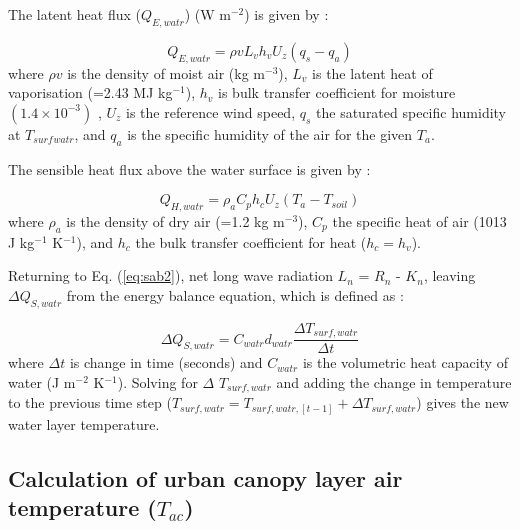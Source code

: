 \documentclass[gmd, manuscript]{copernicus}
\begin{document}
The latent heat flux (\ensuremath{Q_{E,watr}}) (W m$^{-2}$) is given by \cite{Arya2001}:

\begin{equation} 
\ensuremath{Q_{E,watr}} = \ensuremath{\rho v} \ensuremath{L_{v}} \ensuremath{h_{v}} \ensuremath{U_{z}} (\ensuremath{q_{s}} - \ensuremath{q_{a}})
\label{eq:lewtr} \end{equation} where \ensuremath{\rho v} is the density of moist air (kg m$^{-3}$), \ensuremath{L_{v}} is the latent heat of vaporisation (=2.43 MJ kg$^{-1}$), \ensuremath{h_{v}} is bulk transfer coefficient for moisture $(1.4\times10^{-3})$ \citep{Hicks1972,Jones2005}, \ensuremath{U_{z}} is the reference wind speed, \ensuremath{q_{s}} the saturated specific humidity at $T_{surf}$$_{watr}$, and \ensuremath{q_{a}} is the specific humidity of the air for the given \ensuremath{T_{a}}. 

The sensible heat flux above the water surface is given by \cite{MolinaMartinez2006}:


\begin{equation} 
Q_{H,watr} = \ensuremath{\rho_{a}} \ensuremath{C_{p}} \ensuremath{h_{c}} \ensuremath{U_{z}} (\ensuremath{T_{a}}-\ensuremath{T_{soil}})
\label{eq:hwtr} \end{equation} where \ensuremath{\rho_{a}} is the density of dry air (=1.2 kg m$^{-3}$), \ensuremath{C_{p}} the specific heat of air (1013 J kg$^{-1}$ K$^{-1}$), and \ensuremath{h_{c}} the bulk transfer coefficient for heat ($h_{c} = h_{v}$). 

Returning to Eq. (\ref{eq:sab2}), net long wave radiation \ensuremath{L_{n}} = \ensuremath{R_{n}} - \ensuremath{K_{n}}, leaving $\ensuremath{\Delta Q_{S,watr}}$ from the energy balance equation, which is defined as \citep{MolinaMartinez2006}:

\begin{equation} 
\ensuremath{\Delta Q_{S,watr}} = \ensuremath{C_{watr}} \ensuremath{d_{watr}} \frac{\Delta T_{surf,watr}}{\Delta t}
\label{eq:swrt} \end{equation} where $\Delta t$ is change in time (seconds) and \ensuremath{C_{watr}} is the volumetric heat capacity of water (J m$^{-2}$ K$^{-1}$). Solving for $\Delta$ $T_{surf,watr}$ and adding the change in temperature to the previous time step ($T_{surf,watr} = T_{surf,watr,[t-1]}  + \Delta T_{surf,watr}$) gives the new water layer temperature. 




\subsection{Calculation of urban canopy layer air temperature ($T_{ac}$) }\label{sec:calcTac}
\end{document}
